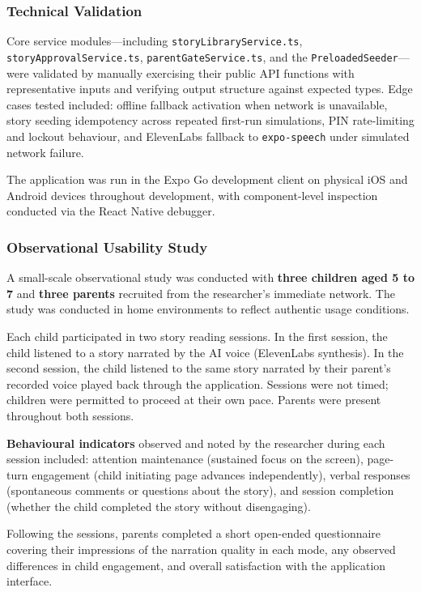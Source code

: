 \subsubsection{Technical Validation}

Core service modules—including \texttt{storyLibraryService.ts}, \texttt{storyApprovalService.ts}, \texttt{parentGateService.ts}, and the \texttt{PreloadedSeeder}—were validated by manually exercising their public API functions with representative inputs and verifying output structure against expected types. Edge cases tested included: offline fallback activation when network is unavailable, story seeding idempotency across repeated first-run simulations, PIN rate-limiting and lockout behaviour, and ElevenLabs fallback to \texttt{expo-speech} under simulated network failure.

The application was run in the Expo Go development client on physical iOS and Android devices throughout development, with component-level inspection conducted via the React Native debugger.

\subsubsection{Observational Usability Study}

A small-scale observational study was conducted with \textbf{three children aged 5 to 7} and \textbf{three parents} recruited from the researcher's immediate network. The study was conducted in home environments to reflect authentic usage conditions.

Each child participated in two story reading sessions. In the first session, the child listened to a story narrated by the AI voice (ElevenLabs synthesis). In the second session, the child listened to the same story narrated by their parent's recorded voice played back through the application. Sessions were not timed; children were permitted to proceed at their own pace. Parents were present throughout both sessions.

\textbf{Behavioural indicators} observed and noted by the researcher during each session included: attention maintenance (sustained focus on the screen), page-turn engagement (child initiating page advances independently), verbal responses (spontaneous comments or questions about the story), and session completion (whether the child completed the story without disengaging).

Following the sessions, parents completed a short open-ended questionnaire covering their impressions of the narration quality in each mode, any observed differences in child engagement, and overall satisfaction with the application interface.

